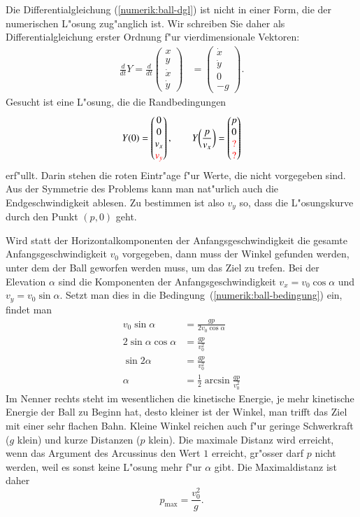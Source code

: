 Die Differentialgleichung (\ref{numerik:ball-dgl}) ist nicht in einer
Form, die der numerischen L"osung zug"anglich ist.
Wir schreiben Sie daher als Differentialgleichung erster Ordnung 
f"ur vierdimensionale Vektoren:
\begin{align}
\frac{d}{dt}Y
=
\frac{d}{dt}\begin{pmatrix}x\\y\\\dot x\\\dot y\end{pmatrix}
&=
\begin{pmatrix}\dot x\\\dot y\\ 0\\ -g\end{pmatrix}.
\label{numerik:ball-dgl-1}
\end{align}
Gesucht ist eine L"osung, die die Randbedingungen
\begin{equation}
Y(0)
=
\begin{pmatrix}0\\0\\v_x\\\color{red}v_y\end{pmatrix},
\qquad
Y\biggl(\frac{p}{v_x}\biggr)
=
\begin{pmatrix}p\\0\\\color{red}?\\\color{red}?\end{pmatrix}
\label{numerik:ball-dgl-2}
\end{equation}
erf"ullt.
Darin stehen die roten Eintr"age f"ur Werte, die nicht vorgegeben sind.
Aus der Symmetrie des Problems kann man nat"urlich auch die Endgeschwindigkeit
ablesen.
Zu bestimmen ist also $v_y$ so, dass die L"osungskurve durch den Punkt
$(p,0)$ geht.

Wird statt der Horizontalkomponenten der Anfangsgeschwindigkeit die
gesamte Anfangsgeschwindigkeit $v_0$ vorgegeben, dann muss der
Winkel gefunden werden, unter dem der Ball geworfen werden muss,
um das Ziel zu trefen.
Bei der Elevation $\alpha$ sind die Komponenten der Anfangsgeschwindigkeit
$v_x=v_0\cos\alpha$ und $v_y=v_0\sin\alpha$. 
Setzt man dies in die Bedingung~(\ref{numerik:ball-bedingung}) ein,
findet man
\begin{align*}
v_0 \sin \alpha &=\frac{gp}{2v_0\cos\alpha}
\\
2\sin\alpha\cos\alpha&=\frac{gp}{v_0^2}
\\
\sin2\alpha&=\frac{gp}{v_0^2}
\\
\alpha&= \frac12 \arcsin\frac{gp}{v_0^2}
\end{align*}
Im Nenner rechts steht im wesentlichen die kinetische Energie,
je mehr kinetische Energie der Ball zu Beginn hat, desto kleiner
ist der Winkel, man trifft das Ziel mit einer sehr flachen Bahn.
Kleine Winkel reichen auch f"ur geringe Schwerkraft ($g$ klein)
und kurze Distanzen ($p$ klein).
Die maximale Distanz wird erreicht, wenn das Argument des Arcussinus
den Wert $1$ erreicht, gr"osser darf $p$ nicht werden, weil es sonst
keine L"osung mehr f"ur $\alpha$ gibt.
Die Maximaldistanz ist daher
\[
p_{\text{max}} = \frac{v_0^2}{g}.
\]

